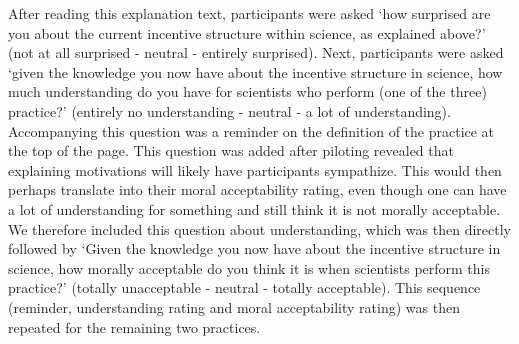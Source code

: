 \documentclass[
  man,floatsintext]{apa7}
\begin{document}
After reading this explanation text, participants were asked `how surprised are you about
the current incentive structure within science, as explained above?'
(not at all surprised - neutral - entirely surprised). Next, participants were
asked `given the knowledge you now have about the incentive structure
in science, how much understanding do you have for scientists who
perform (one of the three) practice?' (entirely no understanding - neutral - a lot of
understanding). Accompanying this question was a reminder on the definition of the practice at the top of the page. This question was added after piloting revealed that explaining motivations will likely have participants sympathize. This would then perhaps translate into their moral acceptability rating, even though one can have a lot of understanding for something and still think it is not morally acceptable. We therefore included this question about
understanding, which was then directly followed by `Given the knowledge
you now have about the incentive structure in science, how morally
acceptable do you think it is when scientists perform this practice?'
(totally unacceptable - neutral - totally acceptable). This sequence (reminder, understanding rating and moral acceptability rating) was then repeated for the remaining two practices.
\end{document}
